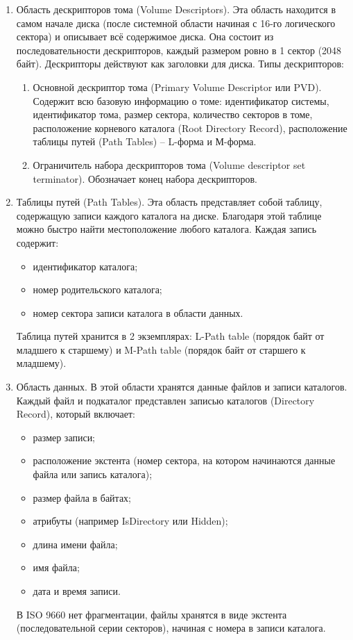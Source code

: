 \begin{enumerate}
\item Область дескрипторов тома (Volume Descriptors). Эта область находится в самом начале диска (после системной области начиная с 16-го логического сектора) и описывает всё содержимое диска. Она состоит из последовательности дескрипторов, каждый размером ровно в 1 сектор (2048 байт). Дескрипторы действуют как заголовки для диска. Типы дескрипторов:
\begin{enumerate}
\item Основной дескриптор тома (Primary Volume Descriptor или PVD). Содержит всю базовую информацию о томе: идентификатор системы, идентификатор тома, размер сектора, количество секторов в томе, расположение корневого каталога (Root Directory Record), расположение таблицы путей (Path Tables) -- L-форма и М-форма.
\item Ограничитель набора дескрипторов тома (Volume descriptor set terminator). Обозначает конец набора дескрипторов.
\end{enumerate}
\item Таблицы путей (Path Tables). Эта область представляет собой таблицу, содержащую записи каждого каталога на диске. Благодаря этой таблице можно быстро найти местоположение любого каталога. Каждая запись содержит:
\begin{itemize}
\item идентификатор каталога;
\item номер родительского каталога;
\item номер сектора записи каталога в области данных.
\end{itemize}
Таблица путей хранится в 2 экземплярах: L-Path table (порядок байт от младшего к старшему) и M-Path table (порядок байт от старшего к младшему).
\item Область данных. В этой области хранятся данные файлов и записи каталогов.
Каждый файл и подкаталог представлен записью каталогов (Directory Record), который включает:
\begin{itemize}
\item размер записи;
\item расположение экстента (номер сектора, на котором начинаются данные файла или запись каталога);
\item размер файла в байтах;
\item атрибуты (например IsDirectory или Hidden);
\item длина имени файла;
\item имя файла;
\item дата и время записи.
\end{itemize}
В ISO 9660 нет фрагментации, файлы хранятся в виде экстента (последовательной серии секторов), начиная с номера в записи каталога.
\end{enumerate}

